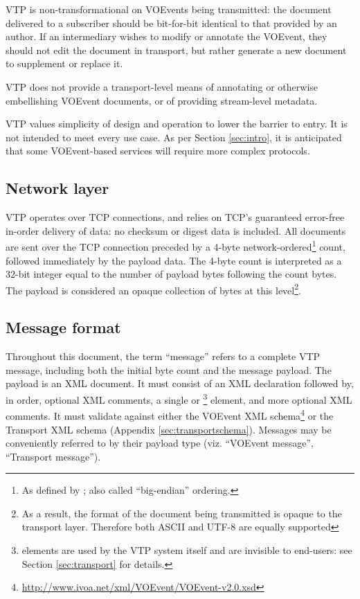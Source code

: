 \documentclass[a4paper,11pt]{ivoa}
\begin{document}
VTP is non-transformational on VOEvents being transmitted: the document
delivered to a subscriber should be bit-for-bit identical to that provided by
an author. If an intermediary wishes to modify or annotate the VOEvent, they
should not edit the document in transport, but rather generate a new document
to supplement or replace it.

VTP does not provide a transport-level means of annotating or otherwise
embellishing VOEvent documents, or of providing stream-level metadata.

VTP values simplicity of design and operation to lower the barrier to entry. It
is not intended to meet every use case. As per Section \ref{sec:intro}, it is
anticipated that some VOEvent-based services will require more complex
protocols.

\subsection{Network layer}

VTP operates over TCP \citep{Cerf:1974} connections, and relies on TCP's
guaranteed error-free in-order delivery of data: no checksum or digest data is
included. All documents are sent over the TCP connection preceded by a 4-byte
network-ordered\footnote{As defined by \citet{Reynolds:1994}; also called
``big-endian'' ordering.} count, followed immediately by the payload data. The
4-byte count is interpreted as a 32-bit integer equal to the number of payload
bytes following the count bytes. The payload is considered an opaque
collection of bytes at this level\footnote{As a result, the format of the
document being transmitted is opaque to the transport layer. Therefore both
ASCII and UTF-8 are equally supported}.

\subsection{Message format}
\label{sec:common:format}

Throughout this document, the term ``message'' refers to a complete VTP
message, including both the initial byte count and the message payload.  The
payload is an XML document. It must consist of an XML declaration followed by,
in order, optional XML comments, a single  or
\footnote{ elements are used by
the VTP system itself and are invisible to end-users: see Section
\ref{sec:transport} for details.} element, and more optional XML comments. It
must validate against either the VOEvent XML
schema\footnote{\url{http://www.ivoa.net/xml/VOEvent/VOEvent-v2.0.xsd}} or the
Transport XML schema (Appendix \ref{sec:transportschema}). Messages may be
conveniently referred to by their payload type (viz. ``VOEvent message'',
``Transport message'').
\end{document}
